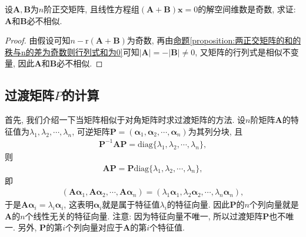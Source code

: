 \documentclass[../../main.tex]{subfiles}
\begin{document}
\begin{example}
设\(\boldsymbol{A},\boldsymbol{B}\)为\(n\)阶正交矩阵, 且线性方程组\((\boldsymbol{A}+\boldsymbol{B})\boldsymbol{x} = 0\)的解空间维数是奇数, 求证: \(\boldsymbol{A}\)和\(\boldsymbol{B}\)必不相似.
\end{example}
\begin{proof}
由假设可知\(n - \mathrm{r}(\boldsymbol{A}+\boldsymbol{B})\)为奇数, 再由\hyperref[proposition:两正交矩阵的和的秩与n的差为奇数则行列式和为0]{命题\ref{proposition:两正交矩阵的和的秩与n的差为奇数则行列式和为0}}可知\(\vert\boldsymbol{A}\vert = -\vert\boldsymbol{B}\vert\neq 0\), 又矩阵的行列式是相似不变量, 因此\(\boldsymbol{A}\)和\(\boldsymbol{B}\)必不相似. 

\end{proof}

\subsection{过渡矩阵$P$的计算}

首先, 我们介绍一下当矩阵相似于对角矩阵时求过渡矩阵的方法. 设\(n\)阶矩阵\(\boldsymbol{A}\)的特征值为\(\lambda_{1},\lambda_{2},\cdots,\lambda_{n}\), 可逆矩阵\(\boldsymbol{P}=(\boldsymbol{\alpha}_{1},\boldsymbol{\alpha}_{2},\cdots,\boldsymbol{\alpha}_{n})\)为其列分块, 且
\begin{align*}
\boldsymbol{P}^{-1}\boldsymbol{AP}=\mathrm{diag}\{\lambda_{1},\lambda_{2},\cdots,\lambda_{n}\},
\end{align*}
则
\begin{align*}
\boldsymbol{AP}=\boldsymbol{P}\mathrm{diag}\{\lambda_{1},\lambda_{2},\cdots,\lambda_{n}\},
\end{align*}
即
\begin{align*}
(\boldsymbol{A}\boldsymbol{\alpha}_{1},\boldsymbol{A}\boldsymbol{\alpha}_{2},\cdots,\boldsymbol{A}\boldsymbol{\alpha}_{n})=(\lambda_{1}\boldsymbol{\alpha}_{1},\lambda_{2}\boldsymbol{\alpha}_{2},\cdots,\lambda_{n}\boldsymbol{\alpha}_{n}),
\end{align*}
于是\(\boldsymbol{A}\boldsymbol{\alpha}_{i}=\lambda_{i}\boldsymbol{\alpha}_{i}\), 这表明\(\boldsymbol{\alpha}_{i}\)就是属于特征值\(\lambda_{i}\)的特征向量. 因此\(\boldsymbol{P}\)的\(n\)个列向量就是\(\boldsymbol{A}\)的\(n\)个线性无关的特征向量. 注意: 因为特征向量不唯一, 所以过渡矩阵\(\boldsymbol{P}\)也不唯一. 另外, \(\boldsymbol{P}\)的第\(i\)个列向量对应于\(\boldsymbol{A}\)的第\(i\)个特征值. 
\end{document}
